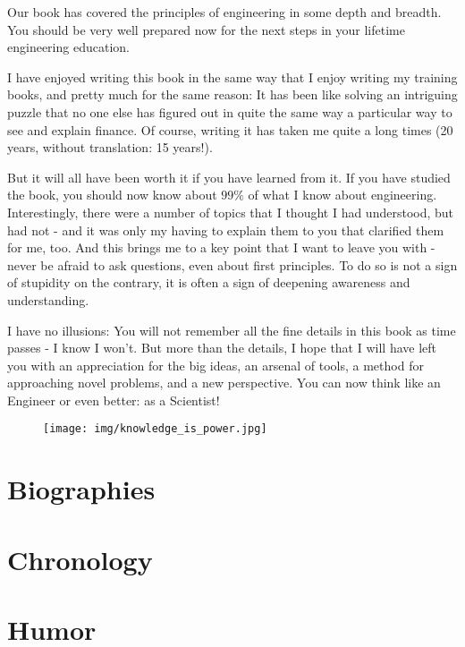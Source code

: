 \documentclass[12pt,a4paper,twoside,openright]{report}
\theoremstyle{definition}
\theoremstyle{itexmp}
\numberwithin{equation}{section}
\begin{document}
	Our book has covered the principles of engineering in some depth and breadth. You should be very well prepared now for the next steps in your lifetime engineering education.
	
	I have enjoyed writing this book in the same way that I enjoy writing my training books, and pretty much for the same reason: It has been like solving an intriguing puzzle that no one else has figured out in quite the same way a particular way to see and explain finance. Of course, writing it has taken me quite a long times (20 years, without translation: 15 years!).
	
	But it will all have been worth it if you have learned from it. If you have studied the book, you should now know about $99\%$ of what I know about engineering. Interestingly, there were a number of topics that I thought I had understood, but had not - and it was only my having to explain them to you that clarified them for me, too. And this brings me to a key point that I want to leave you with - never be afraid to ask questions, even about first principles. To do so is not a sign of stupidity on the contrary, it is often a sign of deepening awareness and understanding.

	I have no illusions: You will not remember all the fine details in this book as time passes - I know I won't. But more than the details, I hope that I will have left you with an appreciation for the big ideas, an arsenal of tools, a method for approaching novel problems, and a new perspective. You can now think like an Engineer or even better: as a Scientist! 
	\begin{figure}[H]
		\centering
		\texttt{[image: img/knowledge\_is\_power.jpg]}	
	\end{figure}
	
	\chapter{Biographies}
	

	\chapter{Chronology}
	

	\chapter{Humor}
	\minitoc
	\pagebreak
	
\end{document}
